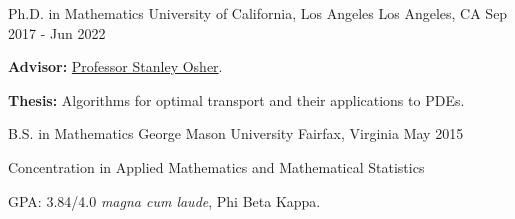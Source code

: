 

\begin{cventries}

  \cventry
    {Ph.D. in Mathematics} %
    {University of California, Los Angeles} %
    {Los Angeles, CA} %
    {Sep 2017 - Jun 2022} %
    {
      \begin{cvitems} %
        \item {\textbf{Advisor:} \href{https://www.math.ucla.edu/~sjo/}{Professor Stanley Osher}.}
        \item {\textbf{Thesis:} Algorithms for optimal transport and their applications to PDEs.}
      \end{cvitems}
    }
    
  \cventry
    {B.S. in Mathematics} %
    {George Mason University} %
    {Fairfax, Virginia} %
    {May 2015} %
    {\begin{cvitems} %
      \item Concentration in Applied Mathematics and Mathematical Statistics
      \item GPA: 3.84/4.0 \textit{magna cum laude}, Phi Beta Kappa.
    \end{cvitems}
    }
    
\end{cventries}
